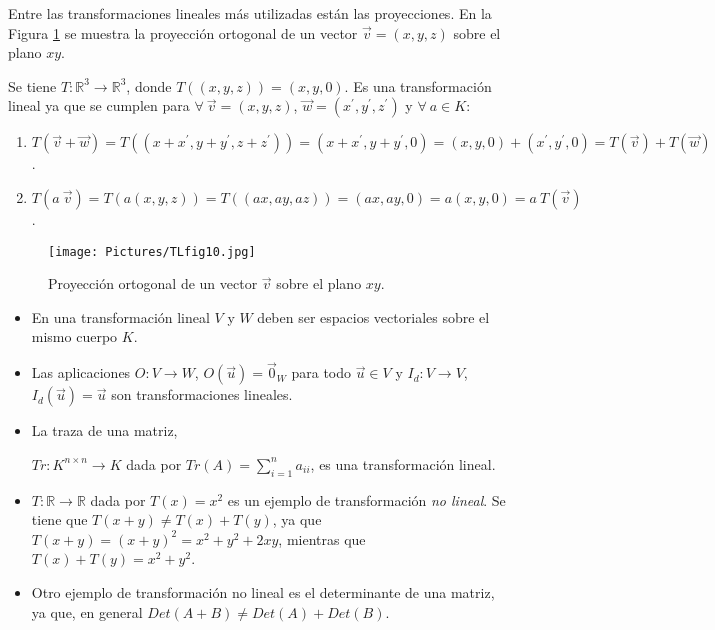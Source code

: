 \bigskip

\bigskip

Entre las transformaciones lineales más utilizadas están las proyecciones. En la Figura \ref{figproyxy} se muestra la proyección ortogonal  de un vector $\vec{v}=(x,y,z)$ sobre el plano $xy$. 

\bigskip

Se tiene $T: \mathbb{R}^3 \rightarrow \mathbb{R}^3$, donde $   T((x,y,z))=(x,y,0)$.
Es una transformación lineal ya que se cumplen para $ \forall ~ \vec{v}=(x,y,z)$, $\vec{w}=(x^{\prime},y^{\prime},z^{\prime})$ y  $ \forall ~a\in K$:



\bigskip

\begin{enumerate}

\item $T(\vec{v}+\vec{w})=T((x+x^{\prime},y+y^{\prime},z+z^{\prime}))= (x+x^{\prime},y+y^{\prime},0) =(x,y,0)+ (x^{\prime},y^{\prime},0)= T(\vec{v})+ T(\vec{w})$.

\bigskip

\item $T(a ~\vec{v})= T( a  (x,y,z)) = T((ax,ay,az)) = (ax,ay,0)=a(x,y,0)=   a~T(\vec{v})$.
  

\end{enumerate}



\bigskip


\begin{figure}[!htbp]
\label{figproyxy}
    \centering
    \texttt{[image: Pictures/TLfig10.jpg]}
    \caption{Proyección ortogonal de un vector $\vec{v}$ sobre el plano $xy$. }
\end{figure}

\begin{remark}
\begin{itemize}
\item En una transformación lineal $V$ y $W$ deben ser espacios vectoriales sobre el mismo cuerpo $K$.

\item Las aplicaciones  $O: V \rightarrow W$, $O(\vec{u})= \vec{0}_W$ para todo $\vec{u} \in V$ y 
$I_d: V \rightarrow V$, $I_d(\vec{u})= \vec{u}$ son  transformaciones lineales.

\item La traza de una matriz, 

$Tr: K^{n \times n } \rightarrow K $ dada por $Tr(A)=\sum_{i=1}^n a_{ii}$, es una transformación lineal.



\item $T: \mathbb{R} \rightarrow \mathbb{R}$ dada por $T(x)=x^2$ es un ejemplo de  transformación \textit{no lineal}.
Se tiene que $T(x+y) \neq T(x) + T(y)$, ya que $T(x+y) = (x+y)^2= x^2 + y^2+2xy$,   mientras que $T(x)+T(y) = x^2 + y^2$.
\item
Otro ejemplo de transformación no lineal es el determinante de una matriz, ya que, en general  $Det(A+B) \neq Det(A)+Det(B)$.
\end{itemize}
\end{remark}


